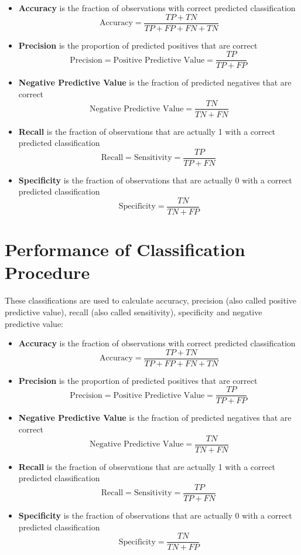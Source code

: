 \documentclass[a4paper,12pt]{article}
\begin{document}
	\begin{itemize}
		\item  \textbf{Accuracy} is the fraction of observations with correct predicted classification
		\[ \mbox{Accuracy}=\frac{TP+TN}{TP+FP+FN+TN}\]
		
		
		\item \textbf{Precision} is the proportion of predicted positives that are correct
		\[
		\mbox{Precision} = \mbox{Positive Predictive Value} =\frac{TP}{TP+FP} \, \]
		
		\item \textbf{Negative Predictive Value} is the  fraction of predicted negatives that are correct
		\[\mbox{Negative Predictive Value} = \frac{TN}{TN+FN}\]
		
		\item \textbf{Recall} is the fraction of observations that are actually 1 with a correct predicted classification
		\[ 
		\mbox{Recall} = \mbox{Sensitivity} = \frac{TP}{TP+FN} \,  \]
		
		\item \textbf{Specificity} is the fraction of observations that are actually 0 with a correct predicted classification
		\[ \mbox{Specificity} = \frac{TN}{TN+FP} \]
		
	\end{itemize}



\section{Performance of Classification Procedure}
	
	These classifications are used to calculate accuracy, precision (also called positive predictive value), recall (also called sensitivity), specificity and negative predictive value:
	
	\begin{itemize}
		\item  \textbf{Accuracy} is the fraction of observations with correct predicted classification
		\[ \mbox{Accuracy}=\frac{TP+TN}{TP+FP+FN+TN}\]
		
		
		\item \textbf{Precision} is the proportion of predicted positives that are correct
		\[
		\mbox{Precision} = \mbox{Positive Predictive Value} =\frac{TP}{TP+FP} \, \]
		
		\item \textbf{Negative Predictive Value} is the  fraction of predicted negatives that are correct
		\[\mbox{Negative Predictive Value} = \frac{TN}{TN+FN}\]
		
		\item \textbf{Recall} is the fraction of observations that are actually 1 with a correct predicted classification
		\[ 
		\mbox{Recall} = \mbox{Sensitivity} = \frac{TP}{TP+FN} \,  \]
		
		\item \textbf{Specificity} is the fraction of observations that are actually 0 with a correct predicted classification
		\[ \mbox{Specificity} = \frac{TN}{TN+FP} \]
		
	\end{itemize}
\end{document}
